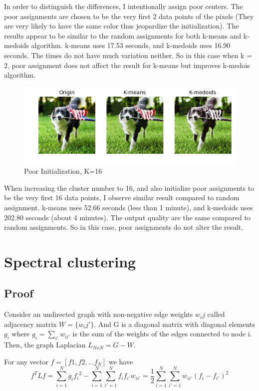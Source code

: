 \documentclass{article}
\begin{document}
In order to distinguish the differences, I intentionally assign poor centers. The poor assignments are chosen to be the very first 2 data points of the pixels (They are very likely to have the same color thus jeopardize the initialization). The results appear to be similar to the random assignments for both k-means and k-medoids algorithm. k-means uses 17.53 seconds, and k-medoids uses 16.90 seconds. The times do not have much variation neither. So in this case when k = 2, poor assignment does not affect the result for k-means but improves k-medois algorithm.
\medskip

\begin{figure}[h!]
\centering
  \caption{Poor Initialization, K=16}
  \includegraphics[scale=0.6]{dog_poor_16.png}
\end{figure}

\break
When increasing the cluster number to 16, and also initialize poor assignments to be the very first 16 data points, I observe similar result compared to random assignment. k-means uses 52.66 seconds (less than 1 minute), and k-medoids uses 202.80 seconds (about 4 minutes). The output quality are the same compared to random assignments. So in this case, poor assignments do not alter the result. 

\section{Spectral clustering}

\subsection{Proof}
Consider an undirected graph with non-negative edge weights $w_ij$ called adjacency matrix $W = \{w_ij'\}$. And G is a diagonal matrix with diagonal elements $g_i$ where $g_i = \sum_{i'} w_{ii'}$ is the sum of the weights of the edges connected to node i. Then, the graph Laplacian $L_{NxN} = G - W$.

For any vector $f = [f1, f2, ... f_N]$ we have
$$
f^TLf = \sum_{i=1}^N g_i {f_i}^2 - \sum_{i=1}^N \sum_{i'=1}^N f_i f_{i'} w_{ii'}
=\frac{1}{2} \sum_{i=1}^N \sum_{i'=1}^N w_{ii'} (f_i - f_{i'})^2
$$
\end{document}
